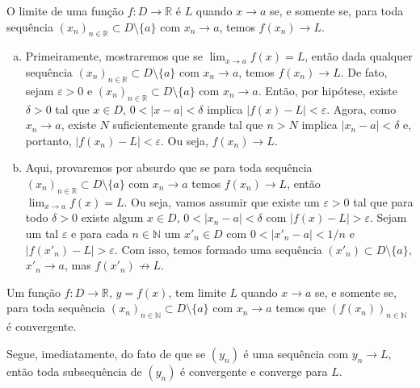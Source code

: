 \begin{teo}\label{teo:limites_e_sequencias}
  O limite de uma função $f:D\to\mathbb{R}$ é $L$ quando $x\to a$ se, e somente se, para toda sequência $(x_n)_{n\in\mathbb{R}}\subset D\setminus\{a\}$ com $x_n\to a$, temos $f(x_n)\to L$.
\end{teo}
\begin{dem}
  \begin{enumerate}[a)]
  \item Primeiramente, mostraremos que se $\lim_{x\to a}f(x) = L$, então dada qualquer sequência $(x_n)_{n\in\mathbb{R}}\subset D\setminus\{a\}$ com $x_n\to a$, temos $f(x_n)\to L$. De fato, sejam $\varepsilon>0$ e $(x_n)_{n\in\mathbb{R}}\subset D\setminus\{a\}$ com $x_n\to a$. Então, por hipótese, existe $\delta>0$ tal que $x\in D$, $0<|x-a|<\delta$ implica $|f(x)-L|<\varepsilon$. Agora, como $x_n\to a$, existe $N$ suficientemente grande tal que $n>N$ implica $|x_n-a|<\delta$ e, portanto, $|f(x_n)-L|<\varepsilon$. Ou seja, $f(x_n)\to L$.
  \item Aqui, provaremos por absurdo que se para toda sequência $(x_n)_{n\in\mathbb{R}}\subset D\setminus\{a\}$ com $x_n\to a$ temos $f(x_n)\to L$, então $\lim_{x\to a}f(x)=L$. Ou seja, vamos assumir que existe um $\varepsilon>0$ tal que para todo $\delta>0$ existe algum $x\in D$, $0<|x_n-a|<\delta$ com $|f(x)-L|>\varepsilon$. Sejam um tal $\varepsilon$ e para cada $n\in\mathbb{N}$ um $x'_n\in D$ com $0<|x'_n-a|<1/n$ e $|f(x'_n)-L|>\varepsilon$. Com isso, temos formado uma sequência $(x'_n)\subset D\setminus\{a\}$, $x'_n\to a$, mas $f(x'_n) \not\to L$.
  \end{enumerate}
\end{dem}

\begin{corol}\label{corol:limites_de_funcoes_e_sequencias}
  Um função $f:D\to\mathbb{R}$, $y=f(x)$, tem limite $L$ quando $x\to a$ se, e somente se, para toda sequência $(x_n)_{n\in\mathbb{N}}\subset D\setminus\{a\}$ com $x_n\to a$ temos que $\left(f(x_n)\right)_{n\in\mathbb{N}}$ é convergente.
\end{corol}
\begin{dem}
  Segue, imediatamente, do fato de que se $(y_n)$ é uma sequência com $y_n\to L$, então toda subsequência de $(y_n)$ é convergente e converge para $L$.
\end{dem}

